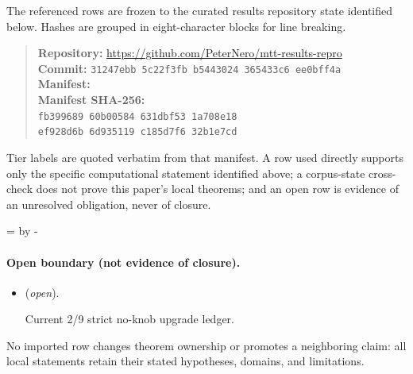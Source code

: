 \documentclass[11pt]{article}
\begin{document}
The referenced rows are frozen to the curated results repository state identified below. Hashes are grouped in eight-character blocks for line breaking.
\begin{quote}\small
\textbf{Repository:} \url{https://github.com/PeterNero/mtt-results-repro}\\
\textbf{Commit:} \texttt{31247ebb 5c22f3fb b5443024 365433c6 ee0bff4a}\\
\textbf{Manifest:} \\
\textbf{Manifest SHA-256:}\\
\texttt{fb399689 60b00584 631dbf53 1a708e18}\\
\texttt{ef928d6b 6d935119 c185d7f6 32b1e7cd}
\end{quote}

Tier labels are quoted verbatim from that manifest. A row used directly supports only the specific computational statement identified above; a corpus-state cross-check does not prove this paper's local theorems; and an open row is evidence of an unresolved obligation, never of closure.

\par\begingroup{}=\pagegoal\advance{} by -\pagetotal\ifdim\dimen0<7\baselineskip\newpage\fi\endgroup
\paragraph{Open boundary (not evidence of closure).}
\begin{itemize}
\setlength{\itemsep}{0.25em}
\item {} (\emph{open}).\par Current 2/9 strict no-knob upgrade ledger.
\end{itemize}

No imported row changes theorem ownership or promotes a neighboring claim: all local statements retain their stated hypotheses, domains, and limitations.
\end{document}
